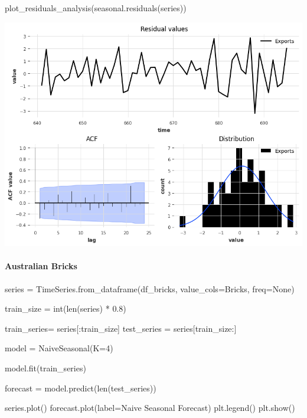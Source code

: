\documentclass[
  11pt,
]{article}
\let\oldparagraph\paragraph
\renewcommand{\paragraph}[1]{\oldparagraph{#1}\mbox{}}
\newenvironment{Shaded}{\begin{snugshade}}{\end{snugshade}}
\newcommand{\BuiltInTok}[1]{\textcolor[rgb]{0.00,0.23,0.31}{#1}}
\newcommand{\DecValTok}[1]{\textcolor[rgb]{0.68,0.00,0.00}{#1}}
\newcommand{\FloatTok}[1]{\textcolor[rgb]{0.68,0.00,0.00}{#1}}
\newcommand{\NormalTok}[1]{\textcolor[rgb]{0.00,0.23,0.31}{#1}}
\newcommand{\OperatorTok}[1]{\textcolor[rgb]{0.37,0.37,0.37}{#1}}
\newcommand{\StringTok}[1]{\textcolor[rgb]{0.13,0.47,0.30}{#1}}
\newcommand{\VariableTok}[1]{\textcolor[rgb]{0.07,0.07,0.07}{#1}}
\begin{document}
\begin{Shaded}
\begin{Highlighting}[]
\NormalTok{plot\_residuals\_analysis(seasonal.residuals(series))}
\end{Highlighting}
\end{Shaded}

\includegraphics{hw3_files/figure-pdf/cell-44-output-1.png}

\paragraph{Australian Bricks}\label{australian-bricks}

\begin{Shaded}
\begin{Highlighting}[]

\NormalTok{series }\OperatorTok{=}\NormalTok{ TimeSeries.from\_dataframe(df\_bricks, value\_cols}\OperatorTok{=}\StringTok{\textquotesingle{}Bricks\textquotesingle{}}\NormalTok{, freq}\OperatorTok{=}\VariableTok{None}\NormalTok{)}
\end{Highlighting}
\end{Shaded}

\begin{Shaded}
\begin{Highlighting}[]
\NormalTok{train\_size }\OperatorTok{=} \BuiltInTok{int}\NormalTok{(}\BuiltInTok{len}\NormalTok{(series) }\OperatorTok{*} \FloatTok{0.8}\NormalTok{)}

\NormalTok{train\_series}\OperatorTok{=}\NormalTok{ series[:train\_size]}
\NormalTok{test\_series }\OperatorTok{=}\NormalTok{ series[train\_size:]}

\NormalTok{model }\OperatorTok{=}\NormalTok{ NaiveSeasonal(K}\OperatorTok{=}\DecValTok{4}\NormalTok{)}

\NormalTok{model.fit(train\_series)}

\NormalTok{forecast }\OperatorTok{=}\NormalTok{ model.predict(}\BuiltInTok{len}\NormalTok{(test\_series))}

\NormalTok{series.plot()}
\NormalTok{forecast.plot(label}\OperatorTok{=}\StringTok{\textquotesingle{}Naive Seasonal Forecast\textquotesingle{}}\NormalTok{)}
\NormalTok{plt.legend()}
\NormalTok{plt.show()}
\end{Highlighting}
\end{Shaded}
\end{document}
